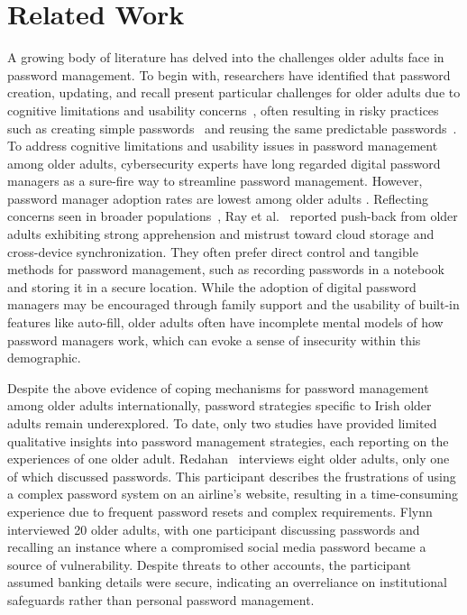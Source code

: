 \section{Related Work}
A growing body of literature has delved into the challenges older adults face in password management. To begin with, researchers have identified that password creation, updating, and recall present particular challenges for older adults due to cognitive limitations and usability concerns~\cite{stobert2014password,frik2019privacy,mentis2019upside}, often resulting in risky practices such as creating simple passwords~\cite{hargittai2013new,wash2016understanding,frik2019privacy} and reusing the same predictable passwords~\cite{grimes2010older,abela_consumer_2017, wei2024sok}. To address cognitive limitations and usability issues in password management among older adults, cybersecurity experts have long regarded digital password managers as a sure-fire way to streamline password management. However, password manager adoption rates are lowest among older adults \cite{ray2021older}. Reflecting concerns seen in broader populations~\cite{karole2011comparative}, Ray et al.~\cite{ray2021older} reported push-back from older adults exhibiting strong apprehension and mistrust toward cloud storage and cross-device synchronization. They often prefer direct control and tangible methods for password management, such as recording passwords in a notebook and storing it in a secure location. While the adoption of digital password managers may be encouraged through family support and the usability of built-in features like auto-fill, older adults often have incomplete mental models of how password managers work, which can evoke a sense of insecurity within this demographic. 


Despite the above evidence of coping mechanisms for password management among older adults internationally, password strategies specific to Irish older adults remain underexplored. To date, only two studies have provided limited qualitative insights into password management strategies, each reporting on the experiences of one older adult. Redahan~\cite{redahan2013older} interviews eight older adults, only one of which discussed passwords. This participant describes the frustrations of using a complex password system on an airline's website, resulting in a time-consuming experience due to frequent password resets and complex requirements. Flynn~\cite{flynn2023ireland} interviewed 20 older adults, with one participant discussing passwords and recalling an instance where a compromised social media password became a source of vulnerability.
Despite threats to other accounts, the participant assumed banking details were secure, indicating an overreliance on institutional safeguards rather than personal password management.


